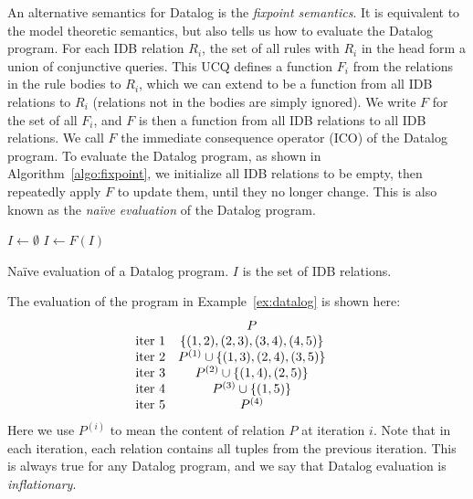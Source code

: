 An alternative semantics for Datalog is the {\em fixpoint semantics}.
It is equivalent to the model theoretic semantics,
 but also tells us how to evaluate the Datalog program.
For each IDB relation $R_i$, the set of all rules with $R_i$ in the head 
 form a union of conjunctive queries.
This UCQ defines a function $F_i$ from the relations in the rule bodies to $R_i$,
 which we can extend to be a function from all IDB relations to $R_i$ 
 (relations not in the bodies are simply ignored). 
We write $F$ for the set of all $F_i$, 
 and $F$ is then a function from all IDB relations to all IDB relations.
We call $F$ the immediate consequence operator (ICO) of the Datalog program.
To evaluate the Datalog program, as shown in Algorithm~\ref{algo:fixpoint},
 we initialize all IDB relations to be empty,
 then repeatedly apply $F$ to update them, 
 until they no longer change.
This is also known as the {\em na\"ive evaluation} of the Datalog program.
\begin{algorithm}
$I \gets \emptyset$\;
{
    $I \gets F(I)$\;
}
\caption{Na\"ive evaluation of a Datalog program. $I$ is the set of IDB relations.}
\label{algo:fixpoint}
\end{algorithm}

\begin{ex}
\label{ex:tc-fixpoint}
The evaluation of the program in Example~\ref{ex:datalog} is shown here:
%
\begin{align*}
    &
    \begin{array}{l c } 
                       & P \\ 
        \text{iter } 1 & \{(1, 2), (2, 3), (3, 4), (4, 5)\} \\ 
        \text{iter } 2 & P^{(1)} \cup \{ (1, 3), (2, 4), (3, 5)\} \\
        \text{iter } 3 & P^{(2)} \cup \{ (1, 4), (2, 5) \} \\
        \text{iter } 4 & P^{(3)} \cup \{ (1, 5) \} \\
        \text{iter } 5 & P^{(4)} \\
    \end{array}
\end{align*}
%
Here we use $P^{(i)}$ to mean the content of relation $P$ at iteration $i$.
Note that in each iteration, each relation contains all tuples from the previous iteration.
This is always true for any Datalog program, 
 and we say that Datalog evaluation is {\em inflationary}.
\end{ex}


